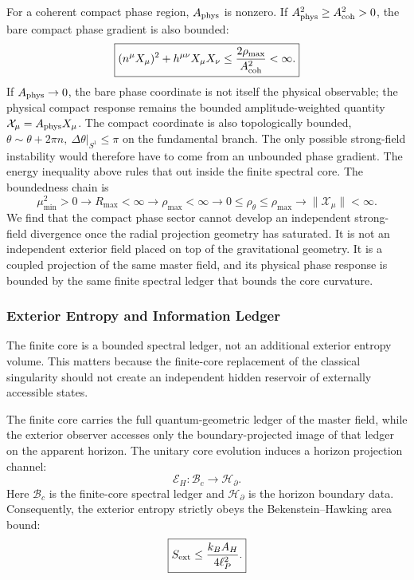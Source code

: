 \documentclass[11pt]{article}
\begin{document}
For a coherent compact phase region, \(A_{\rm phys}\) is nonzero. If
\(A_{\rm phys}^2\geq A_{\rm coh}^2>0\), the bare compact phase gradient is also
bounded:
\begin{equation}
\boxed{
(n^\mu X_\mu)^2
+
h^{\mu\nu}X_\mu X_\nu
\leq
\frac{2\rho_{\max}}{A_{\rm coh}^2}
<
\infty.
}
\end{equation}
If \(A_{\rm phys}\rightarrow0\), the bare phase coordinate is not itself the
physical observable; the physical compact response remains the bounded
amplitude-weighted quantity \(\mathcal X_\mu=A_{\rm phys}X_\mu\). The compact coordinate is also topologically bounded, $\theta\sim\theta+2\pi n, \  \Delta\theta|_{S^1}\leq\pi$ on the fundamental branch. The only possible strong-field instability would therefore have to come from an unbounded phase gradient. The energy inequality
above rules that out inside the finite spectral core. The boundedness chain is
\begin{equation}
\boxed{
\mu_{\min}^2>0
\rightarrow
R_{\max}<\infty
\rightarrow
\rho_{\max}<\infty
\rightarrow
0\leq\rho_\theta\leq\rho_{\max}
\rightarrow
\|\mathcal X_\mu\|<\infty .
}
\end{equation}
We find that the compact phase sector cannot develop an independent strong-field
divergence once the radial projection geometry has saturated. It is not an
independent exterior field placed on top of the gravitational geometry. It is a
coupled projection of the same master field, and its physical phase response is
bounded by the same finite spectral ledger that bounds the core curvature.

\subsubsection{Exterior Entropy and Information Ledger}
\label{sec:exterior_entropy_information_ledger}

The finite core is a bounded spectral ledger, not an additional exterior entropy 
volume. This matters because the finite-core replacement of the classical 
singularity should not create an independent hidden reservoir of externally 
accessible states.

The finite core carries the full quantum-geometric ledger of the master field, 
while the exterior observer accesses only the boundary-projected image of that 
ledger on the apparent horizon. The unitary core evolution induces a horizon 
projection channel:
\begin{equation}
\boxed{
\mathcal E_H:\mathcal B_c\rightarrow\mathcal H_{\partial}.
}
\label{eq:horizon_projection_channel}
\end{equation}
Here \(\mathcal B_c\) is the finite-core spectral ledger and 
\(\mathcal H_{\partial}\) is the horizon boundary data. Consequently, the 
exterior entropy strictly obeys the Bekenstein--Hawking area bound:
\begin{equation}
\boxed{
S_{\rm ext}
\leq
\frac{k_BA_H}{4\ell_P^2}.
}
\label{eq:exterior_entropy_bound}
\end{equation}
\end{document}
